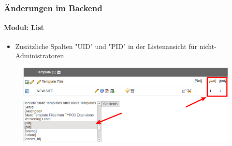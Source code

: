 
\begin{frame}[fragile]
	\frametitle{Änderungen im Backend}
	\framesubtitle{Modul: List}

	\begin{itemize}
		\item Zusätzliche Spalten "UID" und "PID" in der Listenansicht für nicht-Administratoren
	\end{itemize}

	\begin{figure}
		\includegraphics[width=0.95\linewidth]{Images/BackendChanges/AdditionalColumnsInListModule.png}
	\end{figure}

\end{frame}


